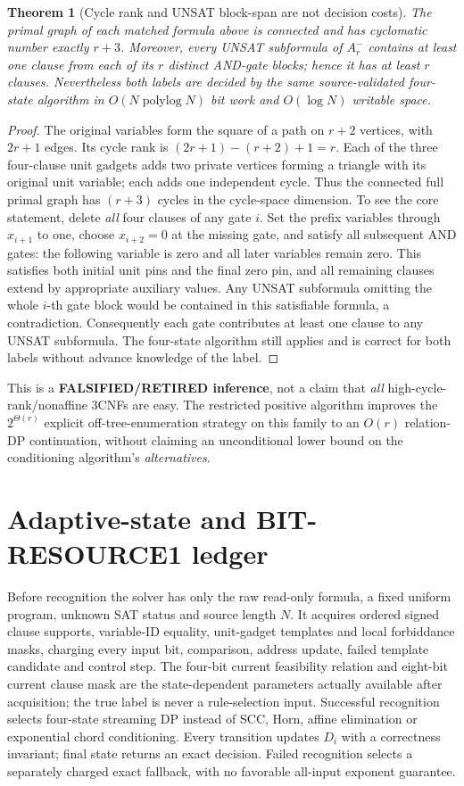 \documentclass[11pt]{article}
\newtheorem{theorem}{Theorem}
\begin{document}
\begin{theorem}[Cycle rank and UNSAT block-span are not decision costs]
The primal graph of each matched formula above is connected and has cyclomatic number \emph{exactly} $r+3$. Moreover, every UNSAT subformula of $A_r^-$ contains at least one clause from each of its $r$ distinct AND-gate blocks; hence it has at least $r$ clauses. Nevertheless both labels are decided by the same source-validated four-state algorithm in $O(N\operatorname{polylog}N)$ bit work and $O(\log N)$ writable space.
\end{theorem}
\begin{proof}
The original variables form the square of a path on $r+2$ vertices, with $2r+1$ edges. Its cycle rank is $(2r+1)-(r+2)+1=r$. Each of the three four-clause unit gadgets adds two private vertices forming a triangle with its original unit variable; each adds one independent cycle. Thus the connected full primal graph has $(r+3)$ cycles in the cycle-space dimension. To see the core statement, delete \emph{all} four clauses of any gate $i$. Set the prefix variables through $x_{i+1}$ to one, choose $x_{i+2}=0$ at the missing gate, and satisfy all subsequent AND gates: the following variable is zero and all later variables remain zero. This satisfies both initial unit pins and the final zero pin, and all remaining clauses extend by appropriate auxiliary values. Any UNSAT subformula omitting the whole $i$-th gate block would be contained in this satisfiable formula, a contradiction. Consequently each gate contributes at least one clause to any UNSAT subformula. The four-state algorithm still applies and is correct for both labels without advance knowledge of the label.
\end{proof}
This is a \textbf{FALSIFIED/RETIRED inference}, not a claim that \emph{all} high-cycle-rank/nonaffine 3CNFs are easy. The restricted positive algorithm improves the $2^{\Theta(r)}$ explicit off-tree-enumeration strategy on this family to an $O(r)$ relation-DP continuation, without claiming an unconditional lower bound on the conditioning algorithm's \emph{alternatives}.

\section{Adaptive-state and BIT-RESOURCE1 ledger}
Before recognition the solver has only the raw read-only formula, a fixed uniform program, unknown SAT status and source length $N$. It acquires ordered signed clause supports, variable-ID equality, unit-gadget templates and local forbiddance masks, charging every input bit, comparison, address update, failed template candidate and control step. The four-bit current feasibility relation and eight-bit current clause mask are the state-dependent parameters actually available after acquisition; the true label is never a rule-selection input. Successful recognition selects four-state streaming DP instead of SCC, Horn, affine elimination or exponential chord conditioning. Every transition updates $D_i$ with a correctness invariant; final state returns an exact decision. Failed recognition selects a separately charged exact fallback, with no favorable all-input exponent guarantee.
\end{document}
